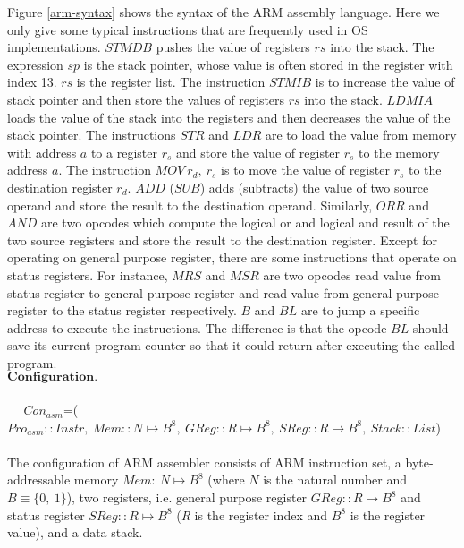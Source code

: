 \documentclass[letterpaper, 10 pt, conference]{IEEEtran}
\begin{document}
\par Figure \ref{arm-syntax} shows the syntax of the ARM assembly language. Here we only give some typical instructions that are frequently used in OS implementations. $STMDB$ pushes the value of registers $rs$ into the stack. The expression $sp$ is the stack pointer, whose value is often stored in the register with index 13. $rs$ is the register list. The instruction $STMIB$ is to increase the value of stack pointer and then store the values of registers $rs$ into the stack. $LDMIA$ loads the value of the stack into the registers and then decreases the value of the stack pointer. The instructions $STR$ and $LDR$ are to load the value from memory with address $a$ to a register $r_s$ and store the value of register $r_s$ to the memory address $a$. The instruction $MOV~r_d,~r_s$ is to move the value of register $r_s$ to the destination register $r_d$. $ADD$ ($SUB$) adds (subtracts) the value of two source operand and store the result to the destination operand. Similarly, $ORR$ and $AND$ are two opcodes which compute the logical or and logical and result of the two source registers and store the result to the destination register. Except for operating on general purpose register, there are some instructions that operate on status registers. For instance, $MRS$ and $MSR$ are two opcodes read value from status register to general purpose register and read value from general purpose register to the status register respectively. $B$ and $BL$ are to jump a specific address to execute the instructions. The difference is that the opcode $BL$ should save its current program counter so that it could return after executing the called program.\\
$\textbf{Configuration.}$\\ \\
$~~~~~~$$Con_{asm}$=($Pro_{asm}::Instr,~Mem::N\mapsto B^8,~GReg::\textit{R}\mapsto B^8,~SReg::\textit{R}\mapsto B^8,~Stack::List$)\\ \\

The configuration of ARM assembler consists of ARM instruction set, a byte-addressable memory $Mem:~N\mapsto B^8$ (where $N$ is the natural number and $B\equiv \{0,~1\}$), two registers, i.e. general purpose register $GReg::\textit{R}\mapsto B^8$ and status register $SReg::\textit{R}\mapsto B^8$ (\textit{R} is the register index and $B^8$ is the register value), and a data stack.\\
\end{document}
